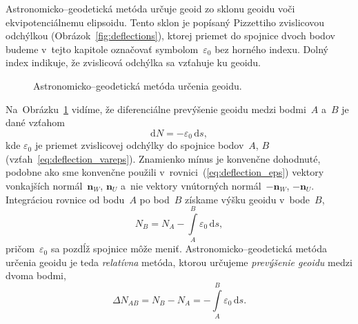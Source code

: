 \documentclass[a4paper,12pt]{book}
\newcommand{\diff}{\mathrm d}
\let\vec\mathbf
\begin{document}
Astronomicko--geodetická metóda určuje geoid zo sklonu geoidu voči 
ekvipotenciálnemu elipsoidu.  Tento sklon je popísaný Pizzettiho zvislicovou 
odchýlkou (Obrázok~\ref{fig:deflections}), ktorej priemet do spojnice dvoch 
bodov budeme v~tejto kapitole označovať symbolom~$\varepsilon_0$ bez horného 
indexu.  Dolný index indikuje, že zvislicová odchýlka sa vzťahuje ku geoidu.

\begin{figure}[bt]
\centering

\caption{Astronomicko--geodetická metóda určenia geoidu.}
\label{fig:astrogeodetic_method}
\end{figure}

Na~Obrázku~\ref{fig:astrogeodetic_method} vidíme, že diferenciálne prevýšenie 
geoidu medzi bodmi~$A$ a~$B$ je dané vzťahom \parencite{MoritzPhysicalGeodesy}
%
\begin{equation}
\label{eq:N_deflections}
\diff N = -\varepsilon_0 \, \diff s{,}
\end{equation}
%
kde $\varepsilon_0$ je priemet zvislicovej odchýlky do spojnice bodov~$A$, $B$ 
(vzťah~\ref{eq:deflection_vareps}).  Znamienko mínus je konvenčne dohodnuté, 
podobne ako sme konvenčne použili v~rovnici~(\ref{eq:deflection_eps}) vektory 
vonkajších normál~$\vec n_W$, $\vec n_U$ a~nie vektory vnútorných normál~$-\vec 
n_W$, $-\vec n_U$.  Integráciou rovnice od bodu~$A$ po bod~$B$ získame výšku 
geoidu v~bode~$B$,
%
\begin{equation}
\label{eq:N_deflections_nb}
N_B = N_A - \int\limits_A^B \varepsilon_0 \, \diff s{,}
\end{equation}
%
pričom~$\varepsilon_0$ sa pozdĺž spojnice môže meniť.  Astronomicko--geodetická 
metóda určenia geoidu je teda \emph{relatívna} metóda, ktorou určujeme 
\emph{prevýšenie geoidu} medzi dvoma bodmi,
%
\begin{equation}
\label{eq:N_deflections_delta}
\Delta N_{AB} = N_B - N_A = - \int\limits_A^B \varepsilon_0 \, \diff s{.}
\end{equation}
\end{document}

